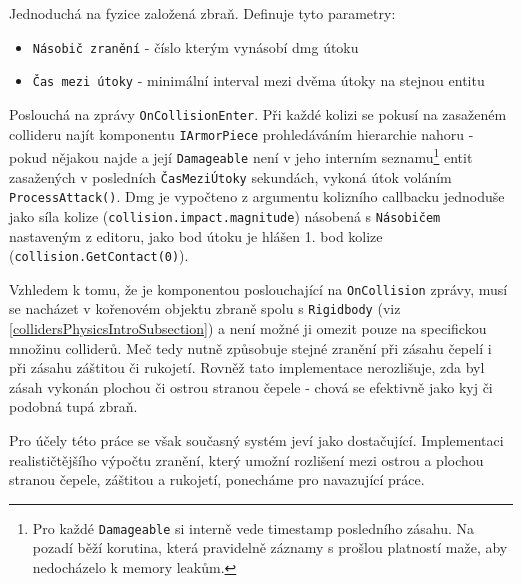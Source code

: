 Jednoduchá na fyzice založená zbraň. Definuje tyto parametry:
\begin{itemize}
  \item \texttt{Násobič zranění} - číslo kterým vynásobí dmg útoku 
  \item \texttt{Čas mezi útoky} - minimální interval mezi dvěma útoky na stejnou entitu
\end{itemize}

Poslouchá na zprávy \texttt{OnCollisionEnter}. Při každé kolizi se pokusí na zasaženém collideru najít komponentu \texttt{IArmorPiece} prohledáváním hierarchie nahoru - pokud nějakou najde a její \texttt{Damageable} není v jeho interním seznamu\footnote{Pro každé \texttt{Damageable} si interně vede timestamp posledního zásahu. Na pozadí běží korutina, která pravidelně záznamy s prošlou platností maže, aby nedocházelo k memory leakům.} entit zasažených v posledních \texttt{ČasMeziÚtoky} sekundách, vykoná útok voláním \texttt{ProcessAttack()}. Dmg je vypočteno z argumentu kolizního callbacku jednoduše jako síla kolize (\texttt{collision.impact.magnitude}) násobená s \texttt{Násobičem} nastaveným z editoru, jako bod útoku je hlášen 1. bod kolize (\texttt{collision.GetContact(0)}). 

Vzhledem k tomu, že je komponentou poslouchající na \texttt{OnCollision} zprávy, musí se nacházet v kořenovém objektu zbraně spolu s \texttt{Rigidbody} (viz \ref{collidersPhysicsIntroSubsection}) a není možné ji omezit pouze na specifickou množinu colliderů. Meč tedy nutně způsobuje stejné zranění při zásahu čepelí i při zásahu záštitou či rukojetí. Rovněž tato implementace nerozlišuje, zda byl zásah vykonán plochou či ostrou stranou čepele - chová se efektivně jako kyj či podobná tupá zbraň. 

Pro účely této práce se však současný systém jeví jako dostačující. Implementaci realističtějšího výpočtu zranění, který umožní rozlišení mezi ostrou a plochou stranou čepele, záštitou a rukojetí, ponecháme pro navazující práce. 

\pagebreak


